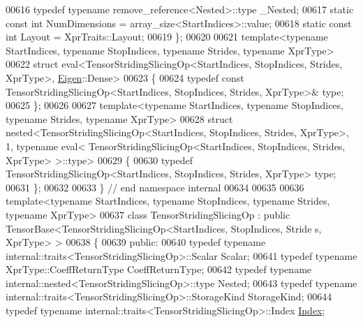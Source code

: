 \begin{DoxyCode}
00616   \textcolor{keyword}{typedef} \textcolor{keyword}{typename} remove\_reference<Nested>::type \_Nested;
00617   \textcolor{keyword}{static} \textcolor{keyword}{const} \textcolor{keywordtype}{int} NumDimensions = array\_size<StartIndices>::value;
00618   \textcolor{keyword}{static} \textcolor{keyword}{const} \textcolor{keywordtype}{int} Layout = XprTraits::Layout;
00619 \};
00620 
00621 \textcolor{keyword}{template}<\textcolor{keyword}{typename} StartIndices, \textcolor{keyword}{typename} StopIndices, \textcolor{keyword}{typename} Str\textcolor{keywordtype}{id}es, \textcolor{keyword}{typename} XprType>
00622 \textcolor{keyword}{struct }eval<TensorStridingSlicingOp<StartIndices, StopIndices, Strides, XprType>, 
      \hyperlink{namespace_eigen}{Eigen}::Dense>
00623 \{
00624   \textcolor{keyword}{typedef} \textcolor{keyword}{const} TensorStridingSlicingOp<StartIndices, StopIndices, Strides, XprType>& type;
00625 \};
00626 
00627 \textcolor{keyword}{template}<\textcolor{keyword}{typename} StartIndices, \textcolor{keyword}{typename} StopIndices, \textcolor{keyword}{typename} Str\textcolor{keywordtype}{id}es, \textcolor{keyword}{typename} XprType>
00628 \textcolor{keyword}{struct }nested<TensorStridingSlicingOp<StartIndices, StopIndices, Strides, XprType>, 1, typename eval<
      TensorStridingSlicingOp<StartIndices, StopIndices, Strides, XprType> >::type>
00629 \{
00630   \textcolor{keyword}{typedef} TensorStridingSlicingOp<StartIndices, StopIndices, Strides, XprType> type;
00631 \};
00632 
00633 \}  \textcolor{comment}{// end namespace internal}
00634 
00635 
00636 \textcolor{keyword}{template}<\textcolor{keyword}{typename} StartIndices, \textcolor{keyword}{typename} StopIndices, \textcolor{keyword}{typename} Str\textcolor{keywordtype}{id}es, \textcolor{keyword}{typename} XprType>
00637 \textcolor{keyword}{class }TensorStridingSlicingOp : \textcolor{keyword}{public} TensorBase<TensorStridingSlicingOp<StartIndices, StopIndices, Stride
      s, XprType> >
00638 \{
00639   \textcolor{keyword}{public}:
00640   \textcolor{keyword}{typedef} \textcolor{keyword}{typename} internal::traits<TensorStridingSlicingOp>::Scalar Scalar;
00641   \textcolor{keyword}{typedef} \textcolor{keyword}{typename} XprType::CoeffReturnType CoeffReturnType;
00642   \textcolor{keyword}{typedef} \textcolor{keyword}{typename} internal::nested<TensorStridingSlicingOp>::type Nested;
00643   \textcolor{keyword}{typedef} \textcolor{keyword}{typename} internal::traits<TensorStridingSlicingOp>::StorageKind StorageKind;
00644   \textcolor{keyword}{typedef} \textcolor{keyword}{typename} internal::traits<TensorStridingSlicingOp>::Index \hyperlink{namespace_eigen_a62e77e0933482dafde8fe197d9a2cfde}{Index};

\end{DoxyCode}
